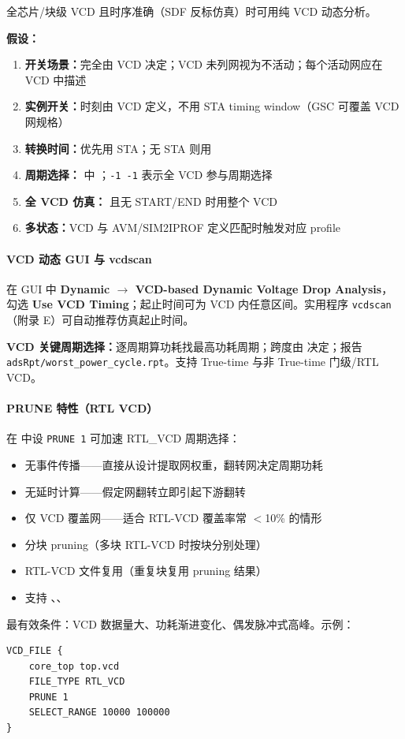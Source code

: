 全芯片/块级 VCD 且时序准确（SDF 反标仿真）时可用纯 VCD 动态分析。

\textbf{假设：}
\begin{enumerate}
  \item \textbf{开关场景：}完全由 VCD 决定；VCD 未列网视为不活动；每个活动网应在 VCD 中描述
  \item \textbf{实例开关：}时刻由 VCD 定义，不用 STA timing window（GSC 可覆盖 VCD 网规格）
  \item \textbf{转换时间：}优先用 STA；无 STA 则用 
  \item \textbf{周期选择：} 中 ；\texttt{-1 -1} 表示全 VCD 参与周期选择
  \item \textbf{全 VCD 仿真：} 且无 START/END 时用整个 VCD
  \item \textbf{多状态：}VCD 与 AVM/SIM2IPROF 定义匹配时触发对应 profile
\end{enumerate}

\paragraph{VCD 动态 GUI 与 vcdscan}
在 GUI 中 \textbf{Dynamic $\rightarrow$ VCD-based Dynamic Voltage Drop Analysis}，勾选 \textbf{Use VCD Timing}；起止时间可为 VCD 内任意区间。实用程序 \texttt{vcdscan}（附录 E）可自动推荐仿真起止时间。

\textbf{VCD 关键周期选择：}逐周期算功耗找最高功耗周期；跨度由  决定；报告 \texttt{adsRpt/worst\_power\_cycle.rpt}。支持 True-time 与非 True-time 门级/RTL VCD。

\paragraph{PRUNE 特性（RTL VCD）}
在  中设 \texttt{PRUNE 1} 可加速 RTL\_VCD 周期选择：
\begin{itemize}
  \item 无事件传播——直接从设计提取网权重，翻转网决定周期功耗
  \item 无延时计算——假定网翻转立即引起下游翻转
  \item 仅 VCD 覆盖网——适合 RTL-VCD 覆盖率常 $<$10\% 的情形
  \item 分块 pruning（多块 RTL-VCD 时按块分别处理）
  \item RTL-VCD 文件复用（重复块复用 pruning 结果）
  \item 支持 、、
\end{itemize}
最有效条件：VCD 数据量大、功耗渐进变化、偶发脉冲式高峰。示例：
\begin{lstlisting}
VCD_FILE {
    core_top top.vcd
    FILE_TYPE RTL_VCD
    PRUNE 1
    SELECT_RANGE 10000 100000
}
\end{lstlisting}

